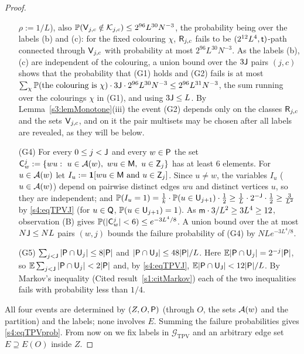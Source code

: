 \begin{proof}
\begin{itemize}
  $\rho:=1/L$), also $\Prob(\vV_{j,c}\notin\mathcal K_{j,c})\le2^{96}L^{30}N^{-3}$, the probability being over the
  labels (b) and (c): for the fixed colouring $\chi$, $\vR_{j,c}$ fails to be $(2^{12}L^4,\vt)$-path connected
  through $\vV_{j,c}$ with probability at most $2^{96}L^{30}N^{-3}$. As the labels (b), (c) are independent of the
  colouring, a union bound over the $3\vJ$ pairs $(j,c)$ shows that the probability that (G1) holds and (G2) fails
  is at most $\sum_{\chi}\Prob(\text{the colouring is }\chi)\cdot3\vJ\cdot2^{96}L^{30}N^{-3}\le2^{96}L^{31}N^{-3}$,
  the sum running over the colourings $\chi$ in (G1), and using $3\vJ\le L$. By
  Lemma~\ref{s3:lemMonotone}(iii) the event (G2) depends only on the classes $\vR_{j,c}$ and the sets $\vV_{j,c}$,
  and on it the pair multisets may be chosen after all labels are revealed, as they will be below.
\item[(G4)] For every $0\le j<\mathsf{J}$ and every $w\in\mathsf{P}$ the set
  $\vC^j_w:=\{wu:\ u\in \Aw(w),\ wu\in\vM,\ u\in\vZ_j\}$ has at least $6$ elements. For $u\in \mathcal{A}(w)$ let
  $I_u:=\mathbf{1}[wu\in\mathsf{M}\text{ and }u\in\mathsf{Z}_j]$. Since $u\ne w$, the variables $I_u$ ($u\in \mathcal{A}(w)$) depend on pairwise
  distinct edges $wu$ and distinct vertices $u$, so they are independent; and
  $\mathbb{P}(I_u=1)=\frac1k\cdot\mathbb{P}(u\in\mathsf{U}_{j+1})\cdot\frac12\ge\frac1L\cdot2^{-\mathsf{J}}\cdot\frac12\ge\frac3{L^2}$ by
  \eqref{s4:eqTPVJ} (for $u\in\mathsf{Q}$, $\mathbb{P}(u\in\mathsf{U}_{j+1})=1$). As $\mathsf{m}\cdot3/L^2\ge3L^4\ge12$, observation
  \textup{(B)} gives $\mathbb{P}(|\mathsf{C}^j_w|<6)\le e^{-3L^4/8}$. A union bound over the at most $N\mathsf{J}\le NL$ pairs $(w,j)$
  bounds the failure probability of (G4) by $NLe^{-3L^4/8}$.
\item[(G5)] $\sum_{j<\mathsf{J}}|\mathsf{P}\cap\mathsf{U}_j|\le8|\mathsf{P}|$ and $|\mathsf{P}\cap\mathsf{U}_{\mathsf{J}}|\le48|\mathsf{P}|/L$. Here
  $\mathbb{E}|\mathsf{P}\cap\mathsf{U}_j|=2^{-j}|\mathsf{P}|$, so $\mathbb{E}\sum_{j<\mathsf{J}}|\mathsf{P}\cap\mathsf{U}_j|<2|\mathsf{P}|$ and, by \eqref{s4:eqTPVJ},
  $\mathbb{E}|\mathsf{P}\cap\mathsf{U}_{\mathsf{J}}|<12|\mathsf{P}|/L$. By Markov's inequality (Cited result~\ref{s1:citMarkov}) each of the two
  inequalities fails with probability less than $1/4$.
\end{itemize}
All four events are determined by $(Z,O,\mathsf{P})$ (through $O$, the sets $\mathcal{A}(w)$ and the partition) and the labels; none
involves $E$. Summing the failure probabilities gives \eqref{s4:eqTPVprob}. From now on we fix labels in
$\mathcal G_{\mathrm{TPV}}$ and an arbitrary edge set $E\supseteq E(O)$ inside $Z$.


\end{proof}
